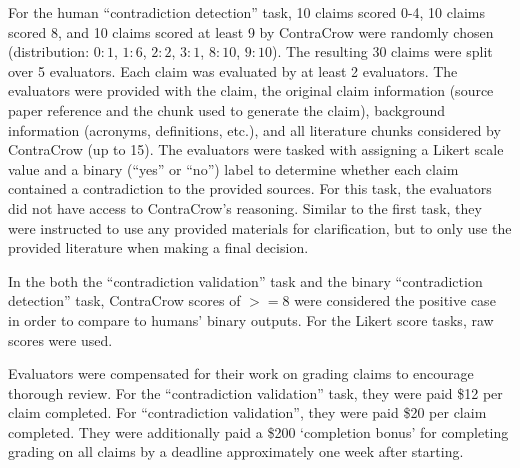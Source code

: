 \documentclass{article}
\begin{document}
For the human ``contradiction detection'' task, 10 claims scored 0-4, 10 claims scored 8, and 10 claims scored at least 9 by ContraCrow were randomly chosen (distribution: $0:1$, $1:6$, $2:2$, $3:1$, $8:10$, $9:10$). The resulting 30 claims were split over 5 evaluators. Each claim was evaluated by at least 2 evaluators. The evaluators were provided with the claim, the original claim information (source paper reference and the chunk used to generate the claim), background information (acronyms, definitions, etc.), and all literature chunks considered by ContraCrow (up to 15). The evaluators were tasked with assigning a Likert scale value and a binary (``yes'' or ``no'') label to determine whether each claim contained a contradiction to the provided sources. For this task, the evaluators did not have access to ContraCrow's reasoning. Similar to the first task, they were instructed to use any provided materials for clarification, but to only use the provided literature when making a final decision. 

In the both the ``contradiction validation'' task and the binary ``contradiction detection'' task, ContraCrow scores of $>=8$ were considered the positive case in order to compare to humans' binary outputs. For the Likert score tasks, raw scores were used.

Evaluators were compensated for their work on grading claims to encourage thorough review. For the ``contradiction validation'' task, they were paid \$12 per claim completed. For ``contradiction validation'', they were paid \$20 per claim completed. They were additionally paid a \$200 `completion bonus' for completing grading on all claims by a deadline approximately one week after starting.
\end{document}
